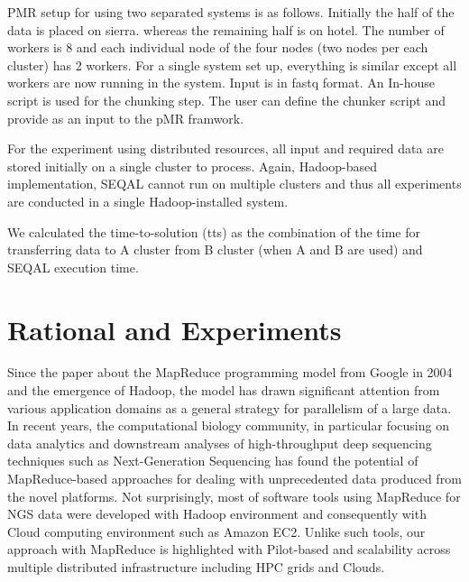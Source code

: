 \documentclass{sig-alternate}
\begin{document}
PMR setup for using two separated systems is as follows.  Initially the half of the data is placed on sierra. whereas the remaining half is on hotel. The number of workers is 8 and each individual node of the four nodes (two nodes per each cluster) has 2 workers.  For a single system set up, everything is similar except all workers are now running in the system.  Input is in fastq format. An In-house script is used for the chunking step. The user can define the chunker script and provide as an input to the pMR framwork.  
 
 
For the experiment using distributed resources, all input and required data are stored initially on a single cluster to process.  Again, Hadoop-based implementation, SEQAL cannot run on multiple clusters and thus all experiments are conducted in a single Hadoop-installed system.

We calculated the time-to-solution (tts) as the combination of the time for transferring data to A cluster from B cluster (when A and B are used) and SEQAL execution time. 
 


\section{Rational and Experiments}\label{sec:experiments}



Since the paper about the MapReduce programming model from Google in 2004\cite{mapreduce-2004-dean} and the emergence of Hadoop, the model has drawn significant attention from various application domains as a general strategy for parallelism of a large data.  In recent years, the computational biology community, in particular focusing on data analytics and downstream analyses of high-throughput deep sequencing techniques such as Next-Generation Sequencing has found the potential of MapReduce-based approaches for dealing with unprecedented data produced from the novel platforms\cite{schatz-nature-biotech-2010}.  Not surprisingly, most of software tools using MapReduce for NGS data were developed with Hadoop environment and consequently with Cloud computing environment such as Amazon EC2.  Unlike such tools, our approach with MapReduce is highlighted with Pilot-based and scalability across multiple distributed infrastructure including HPC grids and Clouds.  
\end{document}
